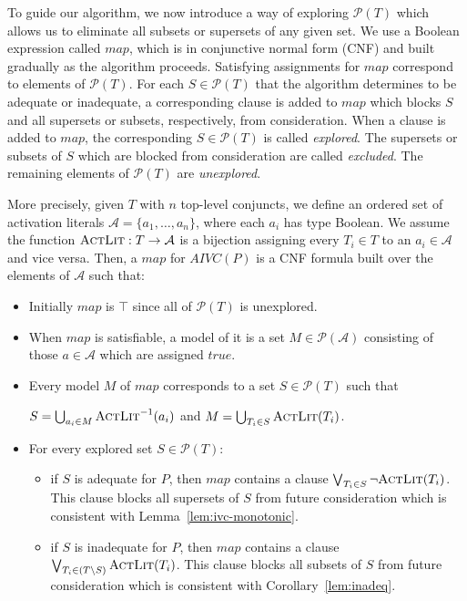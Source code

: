 To guide our algorithm, we now introduce a way of exploring
$\mathcal{P}(T)$ which allows us to eliminate all subsets or supersets
of any given set. We use a Boolean expression called $map$, which is
in conjunctive normal form (CNF) and built gradually as the algorithm
proceeds. Satisfying assignments for $map$ correspond to elements of
$\mathcal{P}(T)$. For each $S \in \mathcal{P}(T)$ that the algorithm
determines to be adequate or inadequate, a corresponding clause is
added to $map$ which blocks $S$ and all supersets or subsets,
respectively, from consideration. When a clause is added to $map$, the
corresponding $S \in \mathcal{P}(T)$ is called \emph{explored}.
The supersets or subsets of $S$ which are blocked from
consideration are called \emph{excluded}. The remaining elements
of $\mathcal{P}(T)$ are \emph{unexplored}.

More precisely, given $T$ with $n$ top-level conjuncts, we define an
ordered set of activation literals $\mathcal{A} = \{a_1, \ldots,
a_n\}$, where each $a_i$ has type Boolean. We assume the function
$\textsc{ActLit} : T \rightarrow \mathcal{A}$ is a bijection assigning every
$T_i \in T$ to an $a_i \in \mathcal{A}$ and vice versa. Then, a $map$
for $AIVC(P)$ is a CNF formula built over the elements of
$\mathcal{A}$ such that:
\begin{itemize}
  \item Initially $map$ is $\top$ since all of $\mathcal{P}(T)$ is unexplored.

  \item When $map$ is satisfiable, a model of it is a set
  $M \in \mathcal{P}(\mathcal{A})$ consisting of those $a \in
    \mathcal{A}$ which are assigned $true$.

  \item Every model $M$ of $map$ corresponds to a set $S \in \mathcal{P}(T)$ such that
  
  $S = \bigcup_{a_i \in M} \textsc{ActLit} ^{-1} (a_i)$ and $M = \bigcup_{T_i \in S} \textsc{ActLit}(T_i)$.
\vspace{0.05in}
  \item For every explored set $S \in \mathcal{P}(T)$:
  \begin{itemize}
    \item if $S$ is adequate for $P$, then $map$ contains a clause
      $\bigvee_{T_{i}\in S} \neg {\textsc{ActLit}(T_i)}$. This clause blocks
      all supersets of $S$ from future consideration which is
      consistent with Lemma~\ref{lem:ivc-monotonic}.

    \item if $S$ is inadequate for $P$, then $map$ contains a clause
      $\bigvee_{T_{i}\in (T \setminus S)} \textsc{ActLit} (T_i)$. This clause
      blocks all subsets of $S$ from future consideration which is
      consistent with Corollary~\ref{lem:inadeq}.
  \end{itemize}
\end{itemize}


